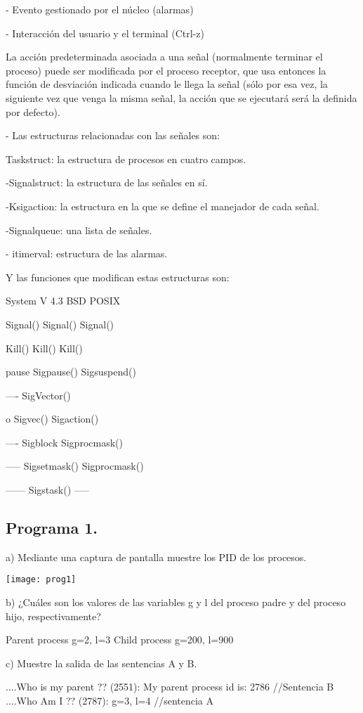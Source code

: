 \documentclass[12pt]{article} %
\begin{document}
-  Evento gestionado por el núcleo (alarmas)

- Interacción del usuario y el terminal (Ctrl-z)

La acción predeterminada asociada a una señal (normalmente terminar el proceso) puede ser modificada por el proceso receptor, que usa entonces la función de desviación indicada cuando le llega la señal (sólo por esa vez, la siguiente vez que venga la misma señal, la acción que se ejecutará será la definida por defecto).

- Las estructuras relacionadas con las señales son:

 Taskstruct: la estructura de procesos en cuatro campos.

-Signalstruct: la estructura de las señales en sí.

 -Ksigaction: la estructura en la que se define el manejador de cada señal.

-Signalqueue: una lista de señales.

- itimerval: estructura de las alarmas.


Y las funciones que modifican estas estructuras son:



System V	4.3 BSD	POSIX

Signal()	Signal()	Signal()

Kill()	Kill()	Kill()

pause	Sigpause()	Sigsuspend()

----	SigVector()

o
Sigvec()	Sigaction()

----	Sigblock	Sigprocmask()

-----	Sigsetmask()	Sigprocmask()

------	Sigstask()	-----


\subsection{Programa 1.}
a) Mediante una captura de pantalla muestre los PID de los procesos.

\texttt{[image: prog1]}

b) ¿Cuáles son los valores de las variables g y l del proceso padre y del proceso hijo, respectivamente?

Parent process g=2, l=3
Child process g=200, l=900


c) Muestre la salida de las sentencias A y B.

 ....Who is my parent ?? (2551): My parent process id is: 2786  //Sentencia B
 ....Who Am I ?? (2787): g=3, l=4  //sentencia A
\end{document}
